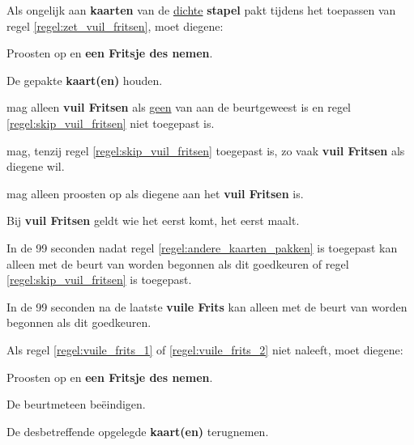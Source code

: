 \vervolgLijst{}
\item Als \eenSpeler ongelijk aan \Frits \textbf{kaarten} van de \ul{dichte} \textbf{stapel} pakt tijdens het toepassen van regel \ref{regel:zet_vuil_fritsen}, moet diegene:
\puntLijst{}
\item Proosten op  en \textbf{een Fritsje des nemen}\footnotemark[3].
\item De gepakte \textbf{kaart(en)} houden.
\eindPuntLijst{}
\eindLijst{}

\vervolgLijst{}
\item \EenSpeler mag alleen \textbf{vuil Fritsen} als \ul{geen} van \alleSpelers aan de beurt\footnotemark[1] geweest is en regel \ref{regel:skip_vuil_fritsen} niet toegepast is.
\eindLijst{}

\vervolgLijst{}
\item \EenSpeler mag, tenzij regel \ref{regel:skip_vuil_fritsen} toegepast is, zo vaak \textbf{vuil Fritsen} als diegene wil.
\eindLijst{}

\vervolgLijst{}
\item \EenSpeler mag alleen proosten op  als diegene aan het \textbf{vuil Fritsen} is.
\eindLijst{}

\vervolgLijst{}
\item Bij \textbf{vuil Fritsen} geldt wie het eerst komt, het eerst maalt.
\eindLijst{}


\vervolgLijst{}
\item In de 99 seconden nadat regel \ref{regel:andere_kaarten_pakken} is toegepast kan alleen met de beurt van \Willem worden begonnen als \alleSpelers dit goedkeuren of regel \ref{regel:skip_vuil_fritsen} is toegepast.
\label{regel:vuile_frits_1}
\eindLijst{}

\vervolgLijst{}
\item In de 99 seconden na de laatste \textbf{vuile Frits} kan alleen met de beurt van \Willem worden begonnen als \alleSpelers dit goedkeuren.
\label{regel:vuile_frits_2}
\eindLijst{}

\vervolgLijst{}
\item Als \Willem regel \ref{regel:vuile_frits_1} of \ref{regel:vuile_frits_2} niet naleeft, moet diegene:
\puntLijst{}
\item Proosten op  en \textbf{een Fritsje des nemen}\footnotemark[3].
\item De beurt\footnotemark[1] meteen beëindigen.
\item De desbetreffende opgelegde \textbf{kaart(en)} terugnemen.
\eindPuntLijst{}
\label{regel:kaarten_terugnemen_1}
\eindLijst{}

